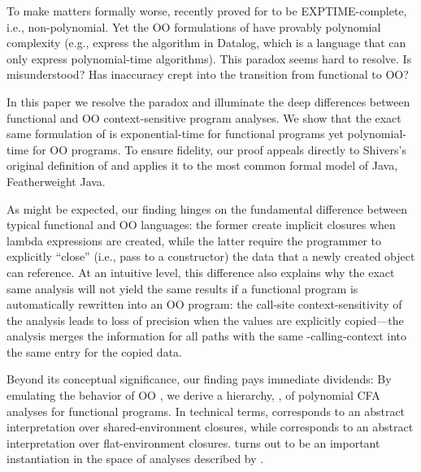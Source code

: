 To make matters formally worse,
\citet{dvanhorn:VanHorn-Mairson:ICFP08} recently proved \kCFA{} for  to be EXPTIME-complete, i.e., non-polynomial.
Yet the OO formulations of \kCFA{} have provably polynomial complexity
(e.g., \citet{BS-OOPSLA09} express the algorithm in Datalog, which is
a language that can only express polynomial-time algorithms). This
paradox seems hard to resolve. Is \kCFA{} misunderstood?  Has 
inaccuracy crept into the transition from functional to OO?

In this paper we resolve the paradox and illuminate the deep
differences between functional and OO context-sensitive program
analyses. We show that the exact same formulation of \kCFA{} is
exponential-time for functional programs yet polynomial-time for OO
programs. To ensure fidelity, our proof appeals directly to Shivers's
original definition of \kCFA{} and applies it to the most common
formal model of Java, Featherweight Java.

As might be expected, our finding hinges on the fundamental
difference between typical functional and OO languages: the former
create implicit closures when lambda expressions are created, while
the latter require the programmer to explicitly ``close'' (i.e., pass
to a constructor) the data that a newly created object can reference.
At an intuitive level, this difference also explains why the exact
same \kCFA{} analysis will not yield the same results if a functional
program is automatically rewritten into an OO program: the call-site
context-sensitivity of the analysis leads to loss of precision when
the values are explicitly copied---the analysis merges the information
for all paths with the same -calling-context into the same entry
for the copied data.

Beyond its conceptual significance, our finding pays immediate
dividends: By emulating the behavior of OO \kCFA{}, we
derive a hierarchy, \nCFA{}, of polynomial CFA analyses for functional
programs. In technical terms, \kCFA{} corresponds to an abstract
interpretation over shared-environment closures, while \nCFA{} 
corresponds to an abstract interpretation over flat-environment
closures.  
\nCFA{} turns out to be an important instantiation in the space of
analyses described by
\citet{mattmight:Jagannathan:1995:Unified}.


























